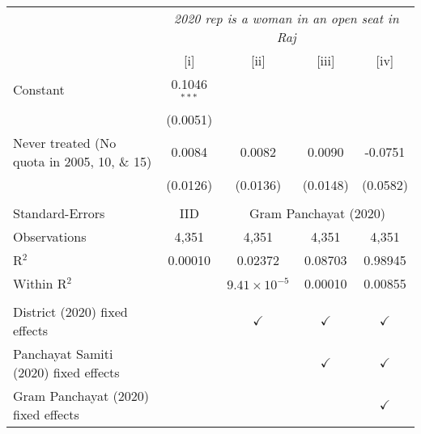 
\begingroup
\centering
\begin{tabular}{lcccc}
   \toprule
    & \multicolumn{4}{c}{\textit{2020 rep is a woman in an open seat in Raj}}\\
                                                & [i]            & [ii]                  & [iii]         & [iv]\\  
   \midrule 
   Constant                                     & 0.1046$^{***}$ &                       &               &   \\   
                                                & (0.0051)       &                       &               &   \\   
   Never treated (No quota in 2005, 10, \& 15)  & 0.0084         & 0.0082                & 0.0090        & -0.0751\\   
                                                & (0.0126)       & (0.0136)              & (0.0148)      & (0.0582)\\   
    \\
   Standard-Errors & IID & \multicolumn{3}{c}{Gram Panchayat (2020)} \\ 
   Observations                                 & 4,351          & 4,351                 & 4,351         & 4,351\\  
   R$^2$                                        & 0.00010        & 0.02372               & 0.08703       & 0.98945\\  
   Within R$^2$                                 &                & $9.41\times 10^{-5}$  & 0.00010       & 0.00855\\  
    \\
   District (2020) fixed effects                &                & $\checkmark$          & $\checkmark$  & $\checkmark$\\   
   Panchayat Samiti (2020) fixed effects        &                &                       & $\checkmark$  & $\checkmark$\\   
   Gram Panchayat (2020) fixed effects          &                &                       &               & $\checkmark$\\   
   \bottomrule
\end{tabular}
\par\endgroup


